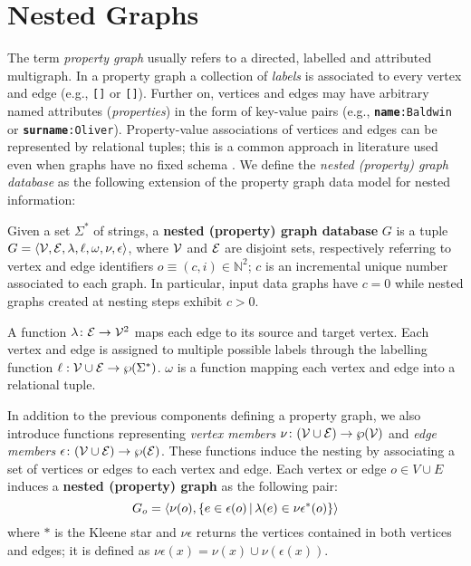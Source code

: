
\section{Nested Graphs}
\label{sec:model}
The term \textit{property graph}  \cite{angles12} usually refers to a directed, labelled and attributed multigraph. 
In a property graph a collection of \textit{labels}  is associated to every vertex and edge (e.g., \texttt{[]} or \texttt{[]}). Further on, vertices and edges may have arbitrary named attributes (\textit{properties}) in the form of key-value pairs (e.g., \texttt{\textbf{name}:Baldwin} or \texttt{\textbf{surname}:Oliver}). Property-value associations of vertices and edges can be represented by relational tuples; this is a common approach in literature used even when graphs have no fixed schema \cite{angles12}. We define the\textit{ nested (property) graph database} as the following extension of the property graph data model for nested information:

\begin{definition}
Given a set $\Sigma^*$ of strings,
	a \textbf{nested (property) graph database} $G$ is a tuple $G=\Braket{\mathcal{V}, \mathcal{E}, \lambda,\ell,\omega,\nu,\epsilon}$, where $\mathcal{V}$ and $\mathcal{E}$ are disjoint sets, respectively referring to vertex and edge identifiers $o\equiv(c,i)\in\mathbb{N}^2$; $c$ is an incremental unique number associated to each graph. In particular, input data graphs have $c=0$ while  nested graphs created at nesting steps exhibit $c>0$. 
	
	A function $\lambda\colon \mathcal{E}\to \mathcal{V}^2$ maps each edge to its source and target vertex. Each vertex and edge is assigned to multiple possible labels through the labelling function $\ell:\mathcal{V}\cup \mathcal{E}\to \wp(\Sigma^*)$.  $\omega$ is a function mapping each vertex and edge into a relational tuple.
	
	In addition to the previous components defining a property graph, we also introduce functions representing \textit{vertex members} $\nu\colon (\mathcal{V}\cup \mathcal{E})\to\wp(\mathcal{V})$ and \textit{edge members} $\epsilon\colon(\mathcal{V}\cup \mathcal{E})\to \wp(\mathcal{E})$. These functions induce the nesting by associating a set of vertices or edges to each vertex and edge. Each vertex or edge $o\in V\cup E$ induces a \textbf{nested (property) graph} as the following pair:
	\[G_o=\Braket{\nu(o),\{e\in\epsilon(o)|\lambda(e)\in {\nu\epsilon}^*(o)\}}\]
	where $*$ is the Kleene star and $\nu\epsilon$ returns the vertices contained in both vertices and edges; it is defined as $\nu\epsilon(x)=\nu(x)\cup \nu(\epsilon(x))$.
\end{definition}


